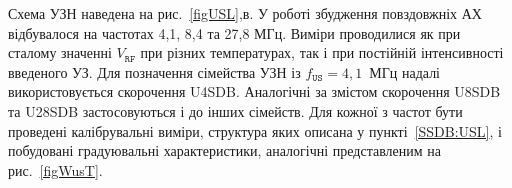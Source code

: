 Схема УЗН наведена на рис.~\ref{figUSL},в.
У роботі збудження повздовжніх АХ відбувалося на частотах 4,1, 8,4 та 27,8 МГц.
Виміри проводилися як при сталому значенні $V_\mathtt{RF}$ при різних температурах, так і при постійній інтенсивності введеного УЗ.
Для позначення сімейства УЗН із $f_\mathtt{US}=4,1$~МГц надалі використовується скорочення U4SDB.
Аналогічні за змістом скорочення U8SDB та U28SDB застосовуються і до інших сімейств.
Для кожної з частот бути проведені калібрувальні виміри, структура яких описана у пункті~\ref{SSDB:USL}, і побудовані градуювальні характеристики,
аналогічні представленим на рис.~\ref{figWusT}.


